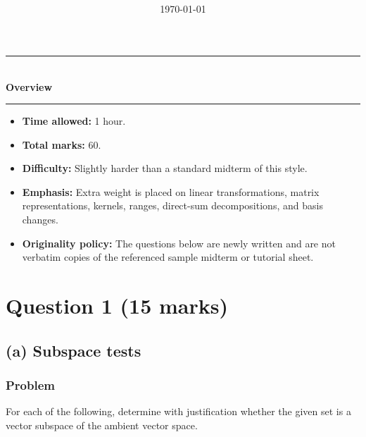 \documentclass[12pt]{article}
\title{
\Huge \CourseCode\ \CourseName \\[0.3em]
\Large \DocType \\[0.3em]
\ExamMeta
}
\date{\today}
\newenvironment{overview}{
\par\bigskip
\begin{center}
\rule{0.92\linewidth}{0.6pt}\\[-0.2em]
\textbf{Overview}\\[-0.2em]
\rule{0.92\linewidth}{0.6pt}
\end{center}
\vspace{-0.3em}
\begin{itemize}[leftmargin=1.6em, itemsep=0.2em, topsep=0.2em]
}{
\end{itemize}
\par\bigskip
}
\begin{document}
\maketitle
\thispagestyle{plainfirst}
\pagestyle{main}

\begin{overview}
\item \textbf{Time allowed:} 1 hour.
\item \textbf{Total marks:} 60.
\item \textbf{Difficulty:} Slightly harder than a standard midterm of this style.
\item \textbf{Emphasis:} Extra weight is placed on linear transformations, matrix representations, kernels, ranges, direct-sum decompositions, and basis changes.
\item \textbf{Originality policy:} The questions below are newly written and are not verbatim copies of the referenced sample midterm or tutorial sheet.
\end{overview}

\newpage
\tableofcontents
\newpage

\section{Question 1 \hfill (15 marks)}

\subsection{(a) Subspace tests}
\subsubsection{Problem}

For each of the following, determine with justification whether the given set is a vector subspace of the ambient vector space.
\end{document}
